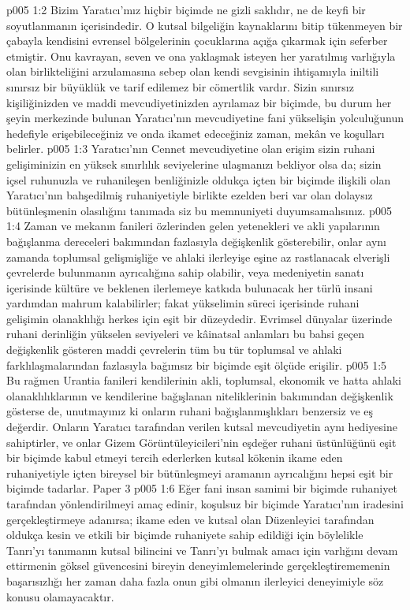\vs p005 1:2 Bizim Yaratıcı’mız hiçbir biçimde ne gizli saklıdır, ne de keyfi bir soyutlanmanın içerisindedir. O kutsal bilgeliğin kaynaklarını bitip tükenmeyen bir çabayla kendisini evrensel bölgelerinin çocuklarına açığa çıkarmak için seferber etmiştir. Onu kavrayan, seven ve ona yaklaşmak isteyen her yaratılmış varlığıyla olan birlikteliğini arzulamasına sebep olan kendi sevgisinin ihtişamıyla iniltili sınırsız bir büyüklük ve tarif edilemez bir cömertlik vardır. Sizin sınırsız kişiliğinizden ve maddi mevcudiyetinizden ayrılamaz bir biçimde, bu durum her şeyin merkezinde bulunan Yaratıcı’nın mevcudiyetine fani yükselişin yolculuğunun hedefiyle erişebileceğiniz ve onda ikamet edeceğiniz zaman, mekân ve koşulları belirler.
\vs p005 1:3 Yaratıcı’nın Cennet mevcudiyetine olan erişim sizin ruhani gelişiminizin en yüksek sınırlılık seviyelerine ulaşmanızı bekliyor olsa da; sizin içsel ruhunuzla ve ruhanileşen benliğinizle oldukça içten bir biçimde ilişkili olan Yaratıcı’nın bahşedilmiş ruhaniyetiyle birlikte ezelden beri var olan dolaysız bütünleşmenin olasılığını tanımada siz bu memnuniyeti duyumsamalısınız.
\vs p005 1:4 Zaman ve mekanın fanileri özlerinden gelen yetenekleri ve akli yapılarının bağışlanma dereceleri bakımından fazlasıyla değişkenlik gösterebilir, onlar aynı zamanda toplumsal gelişmişliğe ve ahlaki ilerleyişe eşine az rastlanacak elverişli çevrelerde bulunmanın ayrıcalığına sahip olabilir, veya medeniyetin sanatı içerisinde kültüre ve beklenen ilerlemeye katkıda bulunacak her türlü insani yardımdan mahrum kalabilirler; fakat yükselimin süreci içerisinde ruhani gelişimin olanaklılığı herkes için eşit bir düzeydedir. Evrimsel dünyalar üzerinde ruhani derinliğin yükselen seviyeleri ve kâinatsal anlamları bu bahsi geçen değişkenlik gösteren maddi çevrelerin tüm bu tür toplumsal ve ahlaki farklılaşmalarından fazlasıyla bağımsız bir biçimde eşit ölçüde erişilir.
\vs p005 1:5 Bu rağmen Urantia fanileri kendilerinin akli, toplumsal, ekonomik ve hatta ahlaki olanaklılıklarının ve kendilerine bağışlanan niteliklerinin bakımından değişkenlik gösterse de, unutmayınız ki onların ruhani bağışlanmışlıkları benzersiz ve eş değerdir. Onların Yaratıcı tarafından verilen kutsal mevcudiyetin aynı hediyesine sahiptirler, ve onlar Gizem Görüntüleyicileri’nin eşdeğer ruhani üstünlüğünü eşit bir biçimde kabul etmeyi tercih ederlerken kutsal kökenin ikame eden ruhaniyetiyle içten bireysel bir bütünleşmeyi aramanın ayrıcalığını hepsi eşit bir biçimde tadarlar. Paper 3
\vs p005 1:6 Eğer fani insan samimi bir biçimde ruhaniyet tarafından yönlendirilmeyi amaç edinir, koşulsuz bir biçimde Yaratıcı’nın iradesini gerçekleştirmeye adanırsa; ikame eden ve kutsal olan Düzenleyici tarafından oldukça kesin ve etkili bir biçimde ruhaniyete sahip edildiği için böylelikle Tanrı’yı tanımanın kutsal bilincini ve Tanrı’yı bulmak amacı için varlığını devam ettirmenin göksel güvencesini bireyin deneyimlemelerinde gerçekleştirememenin başarısızlığı her zaman daha fazla onun gibi olmanın ilerleyici deneyimiyle söz konusu olamayacaktır.

